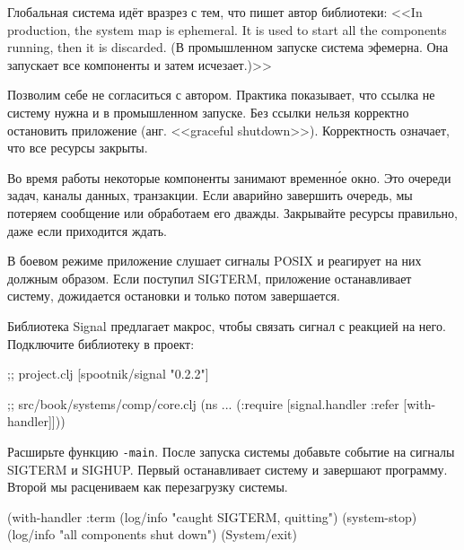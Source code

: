 
Глобальная система идёт вразрез с тем, что пишет автор библиотеки: <<In
production, the system map is ephemeral. It is used to start all the components
running, then it is discarded. (В промышленном запуске система эфемерна. Она
запускает все компоненты и затем исчезает.)>>


Позволим себе не согласиться с автором. Практика показывает, что ссылка не
систему нужна и в промышленном запуске. Без ссылки нельзя корректно остановить
приложение (анг. <<graceful shutdown>>). Корректность означает, что все ресурсы
закрыты.

Во время работы некоторые компоненты занимают временн\'{о}е окно. Это очереди
задач, каналы данных, транзакции. Если аварийно завершить очередь, мы потеряем
сообщение или обработаем его дважды. Закрывайте ресурсы правильно, даже если
приходится ждать.


В боевом режиме приложение слушает сигналы POSIX и реагирует на них должным
образом. Если поступил SIGTERM, приложение останавливает систему, дожидается
остановки и только потом завершается.


Библиотека Signal предлагает макрос,
чтобы связать сигнал с реакцией на него. Подключите библиотеку в проект:

\begin{english}
  \begin{clojure}
;; project.clj
[spootnik/signal "0.2.2"]

;; src/book/systems/comp/core.clj
(ns ...
  (:require [signal.handler :refer [with-handler]]))
  \end{clojure}
\end{english}

Расширьте функцию \verb|-main|. После запуска системы добавьте событие на
сигналы SIGTERM и SIGHUP. Первый останавливает систему и завершают
программу. Второй мы расцениваем как перезагрузку системы.

\begin{english}
  \begin{clojure}
(with-handler :term
  (log/info "caught SIGTERM, quitting")
  (system-stop)
  (log/info "all components shut down")
  (System/exit)
  \end{clojure}
\end{english}

